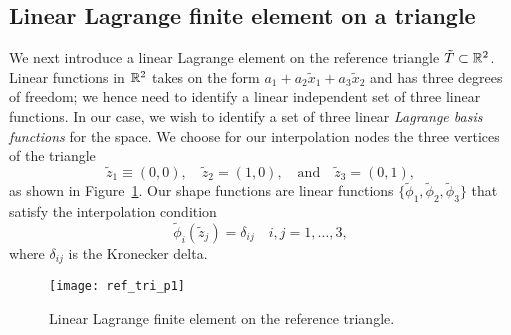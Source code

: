\subsection{Linear Lagrange finite element on a triangle}
\label{sec:fe_lin_tri}

We next introduce a linear Lagrange element on the reference triangle $\tilde T \subset \mathbb{R}^2$.  Linear functions in $\mathbb{R}^2$ takes on the form $a_1 + a_2 \tilde x_1 + a_3 \tilde x_2$ and has three degrees of freedom; we hence need to identify a linear independent set of three linear functions.  In our case, we wish to identify a set of three linear \emph{Lagrange basis functions} for the space.  We choose for our interpolation nodes the three vertices of the triangle
\begin{equation*}
  \tilde z_1 \equiv (0,0),
  \quad \tilde z_2 = (1,0),
  \quad \text{and} \quad \tilde z_3 = (0,1),
\end{equation*}
as shown in Figure~\ref{fig:fe_ref_tri_p1}. Our shape functions are linear functions $\{ \tilde \phi_1, \tilde \phi_2, \tilde \phi_3 \}$ that satisfy the interpolation condition
\begin{equation}
  \tilde \phi_i(\tilde z_j) = \delta_{ij} \quad i,j = 1,\dots,3,
   \label{eq:fe_interp_tri}
\end{equation}
where $\delta_{ij}$ is the Kronecker delta.

\begin{figure}
  \centering
  \texttt{[image: ref\_tri\_p1]}
  \caption{Linear Lagrange finite element on the reference triangle.}
  \label{fig:fe_ref_tri_p1}
\end{figure}

